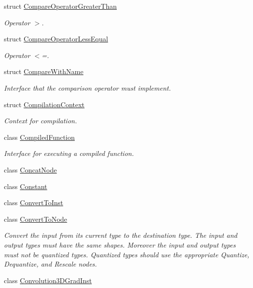 \begin{DoxyCompactItemize}
struct \hyperlink{structglow_1_1_compare_operator_greater_than}{Compare\+Operator\+Greater\+Than}
\begin{DoxyCompactList}\small\item\em Operator $>$. \end{DoxyCompactList}\item 
struct \hyperlink{structglow_1_1_compare_operator_less_equal}{Compare\+Operator\+Less\+Equal}
\begin{DoxyCompactList}\small\item\em Operator $<$=. \end{DoxyCompactList}\item 
struct \hyperlink{structglow_1_1_compare_with_name}{Compare\+With\+Name}
\begin{DoxyCompactList}\small\item\em Interface that the comparison operator must implement. \end{DoxyCompactList}\item 
struct \hyperlink{structglow_1_1_compilation_context}{Compilation\+Context}
\begin{DoxyCompactList}\small\item\em Context for compilation. \end{DoxyCompactList}\item 
class \hyperlink{classglow_1_1_compiled_function}{Compiled\+Function}
\begin{DoxyCompactList}\small\item\em Interface for executing a compiled function. \end{DoxyCompactList}\item 
class \hyperlink{classglow_1_1_concat_node}{Concat\+Node}
\item 
class \hyperlink{classglow_1_1_constant}{Constant}
\item 
class \hyperlink{classglow_1_1_convert_to_inst}{Convert\+To\+Inst}
\item 
class \hyperlink{classglow_1_1_convert_to_node}{Convert\+To\+Node}
\begin{DoxyCompactList}\small\item\em Convert the input from its current type to the destination type. The input and output types must have the same shapes. Moreover the input and output types must not be quantized types. Quantized types should use the appropriate Quantize, Dequantize, and Rescale nodes. \end{DoxyCompactList}\item 
class \hyperlink{classglow_1_1_convolution3_d_grad_inst}{Convolution3\+D\+Grad\+Inst}

\end{DoxyCompactItemize}
